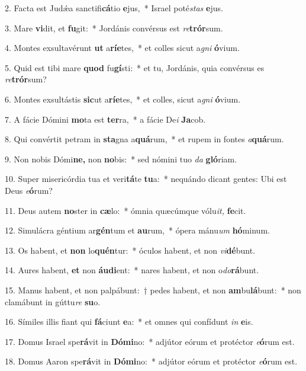 \item 2. Facta est Judǽa sanctifi\textbf{cá}tio \textbf{e}jus,~* Israel poté\textit{stas} \textbf{e}jus.
\item 3. Mare \textbf{vi}dit, et \textbf{fu}git:~* Jordánis convérsus est \textit{re}\textbf{trór}sum.
\item 4. Montes exsultavérunt \textbf{ut} a\textbf{rí}\textbf{e}tes,~* et colles sicut a\textit{gni} \textbf{ó}vium.
\item 5. Quid est tibi mare \textbf{quod} fu\textbf{gí}sti:~* et tu, Jordánis, quia convérsus es \textit{re}\textbf{trór}sum?
\item 6. Montes exsultástis \textbf{sic}ut a\textbf{rí}\textbf{e}tes,~* et colles, sicut a\textit{gni} \textbf{ó}vium.
\item 7. A fácie Dómini \textbf{mo}ta est \textbf{ter}ra,~* a fácie De\textit{i} \textbf{Ja}cob.
\item 8. Qui convértit petram in \textbf{sta}gna a\textbf{quá}rum,~* et rupem in fontes \textit{a}\textbf{quá}rum.
\item 9. Non nobis Dómi\textbf{ne,} non \textbf{no}bis:~* sed nómini tuo \textit{da} \textbf{gló}riam.
\item 10. Super misericórdia tua et veri\textbf{tá}te \textbf{tu}a:~* nequándo dicant gentes: Ubi est Deus \textit{e}\textbf{ó}rum?
\item 11. Deus autem \textbf{no}ster in \textbf{cæ}lo:~* ómnia quæcúmque vólu\textit{it,} \textbf{fe}cit.
\item 12. Simulácra géntium ar\textbf{gén}tum et \textbf{au}rum,~* ópera mánu\tinyhspace\textit{um} \textbf{hó}minum.
\item 13. Os habent, et \textbf{non} lo\textbf{quén}tur:~* óculos habent, et non \textit{vi}\textbf{dé}bunt.
\item 14. Aures habent, \textbf{et} non \textbf{áu}\textbf{di}ent:~* nares habent, et non o\textit{do}\textbf{rá}bunt.
\item 15. Manus habent, et non palpábunt:~† pedes habent, et non \textbf{am}bu\textbf{lá}bunt:~* non clamábunt in gúttu\textit{re} \textbf{su}o.
\item 16. Símiles illis fiant qui \textbf{fá}ciunt \textbf{e}a:~* et omnes qui confídunt \textit{in} \textbf{e}is.
\item 17. Domus Israel spe\textbf{rá}vit in \textbf{Dó}\textbf{mi}no:~* adjútor eórum et protéctor \textit{e}\textbf{ó}rum est.
\item 18. Domus Aaron spe\textbf{rá}vit in \textbf{Dó}\textbf{mi}no:~* adjútor eórum et protéctor \textit{e}\textbf{ó}rum est.
